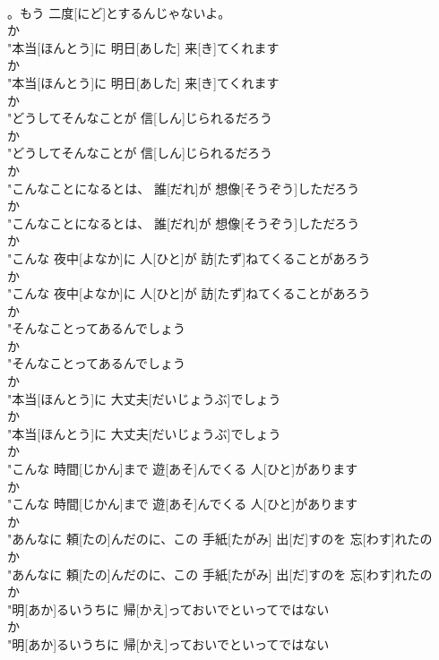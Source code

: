 \documentclass[8pt]{extreport}
\begin{document}
\begin{CJK}{UTF8}{min}
\\	。もう 二度[にど]とするんじゃないよ。
\\	か
\\	"本当[ほんとう]に 明日[あした] 来[き]てくれます
\\	か
\\	"本当[ほんとう]に 明日[あした] 来[き]てくれます
\\	か
\\	"どうしてそんなことが 信[しん]じられるだろう
\\	か
\\	"どうしてそんなことが 信[しん]じられるだろう
\\	か
\\	"こんなことになるとは、 誰[だれ]が 想像[そうぞう]しただろう
\\	か
\\	"こんなことになるとは、 誰[だれ]が 想像[そうぞう]しただろう
\\	か
\\	"こんな 夜中[よなか]に 人[ひと]が 訪[たず]ねてくることがあろう
\\	か
\\	"こんな 夜中[よなか]に 人[ひと]が 訪[たず]ねてくることがあろう
\\	か
\\	"そんなことってあるんでしょう
\\	か
\\	"そんなことってあるんでしょう
\\	か
\\	"本当[ほんとう]に 大丈夫[だいじょうぶ]でしょう
\\	か
\\	"本当[ほんとう]に 大丈夫[だいじょうぶ]でしょう
\\	か
\\	"こんな 時間[じかん]まで 遊[あそ]んでくる 人[ひと]があります
\\	か
\\	"こんな 時間[じかん]まで 遊[あそ]んでくる 人[ひと]があります
\\	か
\\	"あんなに 頼[たの]んだのに、この 手紙[たがみ] 出[だ]すのを 忘[わす]れたの
\\	か
\\	"あんなに 頼[たの]んだのに、この 手紙[たがみ] 出[だ]すのを 忘[わす]れたの
\\	か
\\	"明[あか]るいうちに 帰[かえ]っておいでといってではない
\\	か
\\	"明[あか]るいうちに 帰[かえ]っておいでといってではない

\end{CJK}
\end{document}
